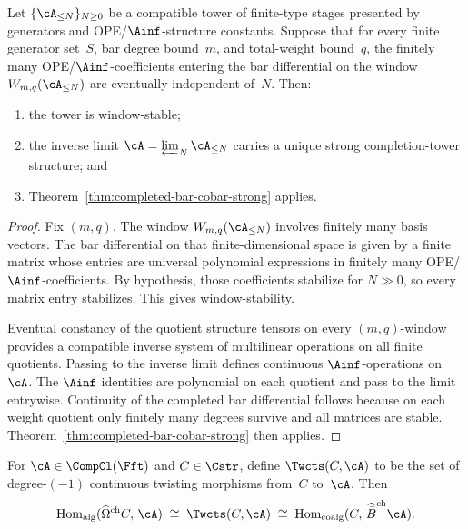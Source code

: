 \begin{theorem}
\label{thm:coefficient-stability-criterion}
Let $\{\cA_{\le N}\}_{N \ge 0}$ be a compatible tower of finite-type
stages presented by generators and OPE/$\Ainf$-structure constants.
Suppose that for every finite generator set~$S$, bar degree bound~$m$,
and total-weight bound~$q$, the finitely many OPE/$\Ainf$-coefficients
entering the bar differential on the window $W_{m,q}(\cA_{\le N})$ are
eventually independent of~$N$. Then:
\begin{enumerate}
\item the tower is window-stable;
\item the inverse limit $\cA = \varprojlim_N \cA_{\le N}$ carries a
 unique strong completion-tower structure; and
\item Theorem~\textup{\ref{thm:completed-bar-cobar-strong}} applies.
\end{enumerate}
\end{theorem}

\begin{proof}
Fix $(m,q)$. The window $W_{m,q}(\cA_{\le N})$ involves finitely many
basis vectors. The bar differential on that finite-dimensional space is
given by a finite matrix whose entries are universal polynomial
expressions in finitely many OPE/$\Ainf$-coefficients. By hypothesis,
those coefficients stabilize for $N \gg 0$, so every matrix entry
stabilizes. This gives window-stability.

Eventual constancy of the quotient structure tensors on every
$(m,q)$-window provides a compatible inverse system of multilinear
operations on all finite quotients. Passing to the inverse limit
defines continuous $\Ainf$-operations on~$\cA$. The $\Ainf$ identities
are polynomial on each quotient and pass to the limit entrywise.
Continuity of the completed bar differential follows because on each
weight quotient only finitely many degrees survive and all matrices are
stable. Theorem~\ref{thm:completed-bar-cobar-strong} then applies.
\end{proof}

\begin{theorem}
\label{thm:completed-twisting-representability}
For $\cA \in \CompCl(\Fft)$ and $C \in \Cstr$, define $\Twcts(C,\cA)$
to be the set of degree-$(-1)$ continuous twisting morphisms from~$C$
to~$\cA$. Then
\[
\operatorname{Hom}_{\mathrm{alg}}(\widehat\Omega^{\mathrm{ch}}C,\,\cA)
\;\cong\; \Twcts(C,\cA)
\;\cong\; \operatorname{Hom}_{\mathrm{coalg}}(C,\,
\widehat{\bar B}^{\mathrm{ch}}\cA).
\]
\end{theorem}

